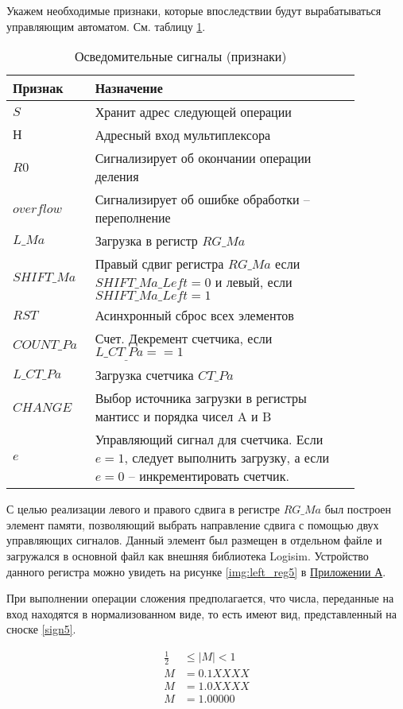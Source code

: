 \documentclass[a4paper,14pt]{extarticle}
\begin{document}
Укажем необходимые признаки, которые впоследствии будут вырабатываться управляющим автоматом. См. таблицу \ref{tab:signals5}.
\begin{table}[h!]
	\centering
	\small
	\begin{tabular}{|m{0.17\linewidth}|m{0.7\linewidth}|}
		\hline
		\textbf{Признак} & \textbf{Назначение} \\ \hline
		$S$ & Хранит адрес следующей операции \\ \hline
		$Н$ & Адресный вход мультиплексора \\ \hline
		$R0$ & Сигнализирует об окончании операции деления \\ \hline
		$overflow$ & Сигнализирует об ошибке обработки -- переполнение \\ \hline
		$L\_Ma$ & Загрузка в регистр $RG\_Ma$ \\ \hline
		$SHIFT\_Ma$ & Правый сдвиг регистра $RG\_Ma$ если $SHIFT\_Ma\_Left=0$ и левый, если  $SHIFT\_Ma\_Left=1$ \\ \hline
		$RST$ & Асинхронный сброс всех элементов \\ \hline
		$COUNT\_Pa$ & Счет. Декремент счетчика, если $L\_CT_\_Pa==1$ \\ \hline
		$L\_CT\_Pa$ & Загрузка счетчика $CT\_Pa$ \\ \hline
		$CHANGE$ & Выбор источника загрузки в регистры мантисс и порядка чисел A и B \\ \hline
		$e$ & Управляющий сигнал для счетчика. Если $e=1$, следует выполнить загрузку, а если $e=0$ -- инкрементировать счетчик. \\ \hline
	\end{tabular}
	\caption{Осведомительные сигналы (признаки)}
	\label{tab:signals5}
\end{table}
С целью реализации левого и правого сдвига в регистре $RG\_Ma$ был построен элемент памяти, позволяющий выбрать направление сдвига с помощью двух управляющих сигналов. Данный элемент был размещен в отдельном файле и загружался в основной файл как внешняя библиотека Logisim. Устройство данного регистра можно увидеть на рисунке \ref{img:left_reg5} в \hyperref[tam]{Приложении А}.

При выполнении операции сложения предполагается, что числа, переданные на вход находятся в нормализованном виде, то есть имеют вид, представленный на сноске \ref{sign5}.

\begin{equation}
\begin{aligned}
\label{sign}
\frac12&\le \left|M\right|< 1\\
M &= 0.1XXXX\\
M &= 1.0XXXX\\
M&=1.00000\\
\end{aligned}
\end{equation}
\end{document}
